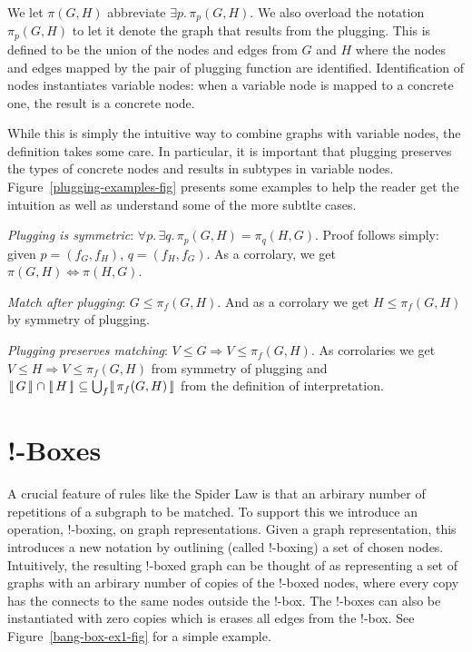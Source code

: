 \documentclass[runningheads]{llncs}
\newcommand{\vinterp}[1]{\lfloor\hspace{-0.27em}|\, #1\, |\hspace{-0.27em}\rfloor}
\begin{document}
We let $\pi(G,H)$ abbreviate $\exists p.\,\pi_p(G,H)$. We also
overload the notation $\pi_p(G,H)$ to let it denote the graph that
results from the plugging. This is defined to be the union of the
nodes and edges from $G$ and $H$ where the nodes and edges mapped by
the pair of plugging function are identified. Identification of nodes
instantiates variable nodes: when a variable node is mapped to a
concrete one, the result is a concrete node.

While this is simply the intuitive way to combine graphs with variable
nodes, the definition takes some care. In particular, it is important
that plugging preserves the types of concrete nodes and results in
subtypes in variable nodes. Figure~\ref{plugging-examples-fig}
presents some examples to help the reader get the intuition as well as
understand some of the more subtlte cases.

\begin{theorem}
  \emph{Plugging is symmetric}: $\forall p.\, \exists q.\, \pi_p(G,H)
  = \pi_q(H,G)$. Proof follows simply: given $p = (f_G,f_H)$, $q =
  (f_H,f_G)$. As a corrolary, we get $\pi(G,H) \Leftrightarrow
  \pi(H,G)$.
\end{theorem}

\begin{theorem}
  \emph{Match after plugging}: $G \leq \pi_f(G,H)$. And as a corrolary
  we get $H \leq \pi_f(G,H)$ by symmetry of plugging. 
\end{theorem}

\begin{theorem}
  \emph{Plugging preserves matching}: $V \leq G \Rightarrow V \leq
  \pi_f(G,H)$. As corrolaries we get $V \leq H \Rightarrow V \leq
  \pi_f(G,H)$ from symmetry of plugging and $\vinterp{G} \cap
  \vinterp{H} \subseteq \bigcup_f \vinterp{\pi_f(G,H)}$ from the
  definition of interpretation. 
\end{theorem}




\section{!-Boxes}

A crucial feature of rules like the Spider Law is that an arbirary
number of repetitions of a subgraph to be matched. To support this we
introduce an operation, !-boxing, on graph representations. Given a
graph representation, this introduces a new notation by outlining
(called !-boxing) a set of chosen nodes. Intuitively, the resulting
!-boxed graph can be thought of as representing a set of graphs with
an arbirary number of copies of the !-boxed nodes, where every copy
has the connects to the same nodes outside the !-box. The !-boxes can
also be instantiated with zero copies which is erases all edges from
the !-box. See Figure~\ref{bang-box-ex1-fig} for a simple example.
\end{document}
